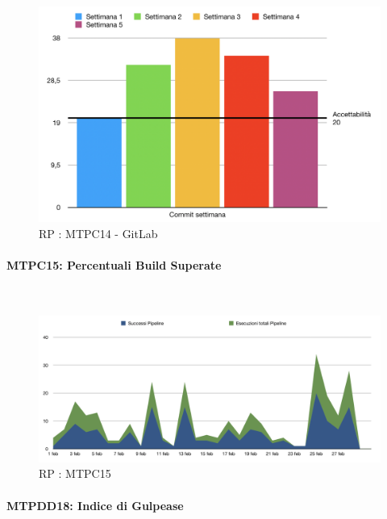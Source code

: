 \begin{figure}[H]
	\begin{center}
		\includegraphics[scale=0.5]{./images/grafici_RP/commitGitlab.png} 
	\end{center}
	\caption{RP : MTPC14 - GitLab}
\end{figure}


\paragraph{MTPC15: Percentuali Build Superate}\-\\
\begin{figure}[H]
	\begin{center}
		\includegraphics[scale=0.4]{./images/grafici_RP/graficoPipeline.png} 
	\end{center}
	\caption{RP : MTPC15}
\end{figure}

\pagebreak

\paragraph{MTPDD18: Indice di Gulpease}\-\\
\label{gulpi}

